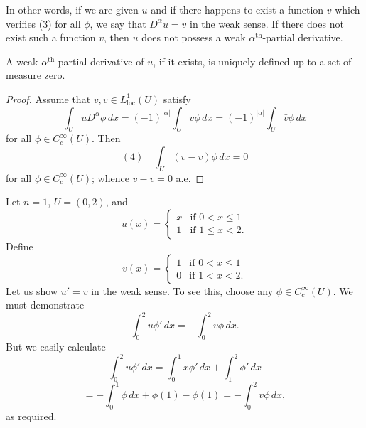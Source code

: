 In other words, if we are given $u$ and if there happens to exist a function $v$ which verifies (3) for all $\phi$, we say that $D^\alpha u = v$ in the weak sense. If there does not exist such a function $v$, then $u$ does not possess a weak $\alpha^{\text{th}}$-partial derivative.

\begin{lemma}
\label{lem:weak-derivative-uniqueness}
A weak $\alpha^{\text{th}}$-partial derivative of $u$, if it exists, is uniquely defined up to a set of measure zero.
\end{lemma}

\begin{proof}
Assume that $v, \bar{v} \in L^1_{\text{loc}}(U)$ satisfy
$$\int_U u D^\alpha \phi \, dx = (-1)^{|\alpha|} \int_U v\phi \, dx = (-1)^{|\alpha|} \int_U \bar{v}\phi \, dx$$
for all $\phi \in C_c^\infty(U)$. Then
$$(4) \quad \int_U (v - \bar{v})\phi \, dx = 0$$
for all $\phi \in C_c^\infty(U)$; whence $v - \bar{v} = 0$ a.e.
\end{proof}

\begin{example}
\label{ex:weak-derivative-piecewise-linear-example}
Let $n = 1$, $U = (0,2)$, and
$$u(x) = \begin{cases}
x & \text{if } 0 < x \le 1 \\
1 & \text{if } 1 \le x < 2.
\end{cases}$$
Define
$$v(x) = \begin{cases}
1 & \text{if } 0 < x \le 1 \\
0 & \text{if } 1 < x < 2.
\end{cases}$$
Let us show $u' = v$ in the weak sense. To see this, choose any $\phi \in C_c^\infty(U)$. We must demonstrate
$$\int_0^2 u\phi' \, dx = -\int_0^2 v\phi \, dx.$$
But we easily calculate
$$\int_0^2 u\phi' \, dx = \int_0^1 x\phi' \, dx + \int_1^2 \phi' \, dx$$
$$= -\int_0^1 \phi \, dx + \phi(1) - \phi(1) = -\int_0^2 v\phi \, dx,$$
as required.
\end{example}

